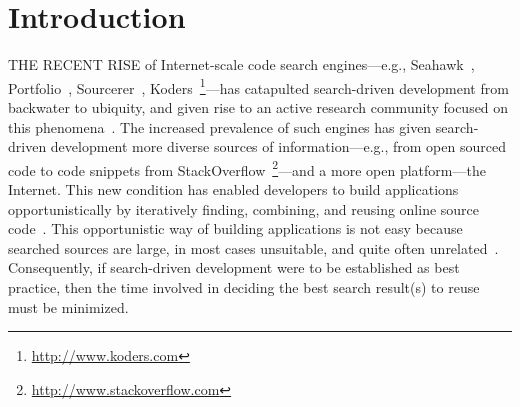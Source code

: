 \chapter{Introduction}{}
\label{sec:intro}


\lettrine[lraise=0.1, nindent=0em, slope=-.5em]{T}{HE RECENT RISE} of Internet-scale code search engines---e.g., Seahawk~\cite{Bacchelli:2012dl}, Portfolio~\cite{McMillan:2011wq}, Sourcerer~\cite{Bajracharya:2006vn}, Koders~\footnote{\url{http://www.koders.com}}---has catapulted search-driven development from backwater to ubiquity, and given rise to an active research community focused on this phenomena~\cite{Bajracharya:2009fj, Bajracharya:2010iy, Bajracharya:2011kw}. The increased prevalence of such engines has given search-driven development more diverse sources of information---e.g., from open sourced code to code snippets from StackOverflow~\footnote{\url{http://www.stackoverflow.com}}---and a more open platform---the Internet. This new condition has enabled developers to build applications opportunistically by iteratively finding, combining, and reusing online source code~\cite{Brandt:2008wi, Ncube:2008fm, Brandt:2009jb, McMillan:2012dj}. This opportunistic way of building applications is not easy because searched sources are large, in most cases unsuitable, and quite often unrelated~\cite{GallardoValencia:2009gr}. Consequently, if search-driven development were to be established as best practice, then the time involved in deciding the best search result(s) to reuse must be minimized.

